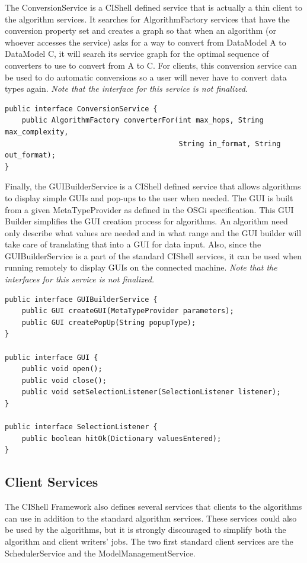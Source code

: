 \documentclass[a4]{article}
\begin{document}
The ConversionService is a CIShell defined service that is actually a thin 
client to the algorithm services. It searches for AlgorithmFactory services 
that have the conversion property set and creates a graph so that when an 
algorithm (or whoever accesses the service) asks for a way to convert from 
DataModel A to DataModel C, it will search its service graph for the optimal 
sequence of converters to use to convert from A to C. For clients, this 
conversion service can be used to do automatic conversions so a user will never 
have to convert data types again. \textit{Note that the interface for this 
service is not finalized.}

\begin{verbatim}
public interface ConversionService {
    public AlgorithmFactory converterFor(int max_hops, String max_complexity,
                                         String in_format, String out_format);
}
\end{verbatim}

Finally, the GUIBuilderService is a CIShell defined service that allows
algorithms to display simple GUIs and pop-ups to the user when needed. The GUI
is built from a given MetaTypeProvider as defined in the OSGi specification.
This GUI Builder simplifies the GUI creation process for algorithms. An
algorithm need only describe what values are needed and in what range and the
GUI builder will take care of translating that into a GUI for data input. Also,
since the GUIBuilderService is a part of the standard CIShell services, it can
be used when running remotely to display GUIs on the connected machine. 
\textit{Note that the interfaces for this service is not finalized.}

\begin{verbatim}
public interface GUIBuilderService {
    public GUI createGUI(MetaTypeProvider parameters);
    public GUI createPopUp(String popupType);
}

public interface GUI {
    public void open();
    public void close();
    public void setSelectionListener(SelectionListener listener);
}

public interface SelectionListener {
    public boolean hitOk(Dictionary valuesEntered);
}
\end{verbatim}

\subsection{Client Services}

The CIShell Framework also defines several services that clients to the 
algorithms can use in addition to the standard algorithm services. These 
services could also be used by the algorithms, but it is strongly discouraged 
to simplify both the algorithm and client writers' jobs. The two first standard 
client services are the SchedulerService and the ModelManagementService.
\end{document}
